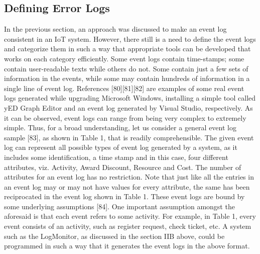 \subsection{Defining Error Logs}

In the previous section, an approach was discussed to make an event log consistent in an IoT system. However, there still is a need to define the event logs and categorize them in such a way that appropriate tools can be developed that works on each category efficiently. Some event logs contain time-stamps; some contain user-readable texts while others do not. Some contain just a few sets of information in the events, while some may contain hundreds of information in a single line of event log. References [80][81][82] are examples of some real event logs generated while upgrading Microsoft Windows, installing a simple tool called yED Graph Editor and an event log generated by Visual Studio, respectively. As it can be observed, event logs can range from being very complex to extremely simple. Thus, for a broad understanding, let us consider a general event log sample [83], as shown in Table 1, that is readily comprehensible. The given event log can represent all possible types of event log generated by a system, as it includes some identification, a time stamp and in this case, four different attributes, viz. Activity, Award Discount, Resource and Cost. The number of attributes for an event log has no restriction. Note that just like all the entries in an event log may or may not have values for every attribute, the same has been reciprocated in the event log shown in Table 1. These event logs are bound by some underlying assumptions [84]. One important assumption amongst the aforesaid is that each event refers to some activity. For example, in Table 1, every event consists of an activity, such as register request, check ticket, etc. A system such as the LogMonitor, as discussed in the section IIB above, could be programmed in such a way that it generates the event logs in the above format.

